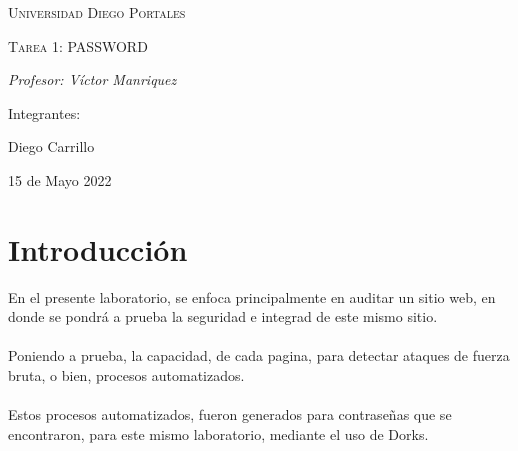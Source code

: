 \documentclass{article}
\begin{document}
    \begin{titlepage}
        \centering
        \vspace{1cm}
        {\scshape\Large Universidad Diego Portales \par}
        \vspace{2cm}
        {\scshape\Huge Tarea 1: PASSWORD\par}
        \vspace{1cm}
        \vspace{1cm}
        {\itshape\Large Profesor: Víctor Manriquez \par}
        \vfill
        {\Large Integrantes: \par}
        {\Large Diego Carrillo \par}
        \vfill
        {\Large 15 de Mayo 2022 \par}
    \end{titlepage}

\tableofcontents
 \newpage
 \section{Introducción}
 En el presente laboratorio, se enfoca principalmente en auditar un sitio web, en donde se pondrá a prueba la seguridad e integrad de este mismo sitio. 
 \\\\
 Poniendo a prueba, la capacidad, de cada pagina, para detectar ataques de fuerza bruta, o bien, procesos automatizados.
 \\\\
 Estos procesos automatizados, fueron generados para contraseñas que se encontraron, para este mismo laboratorio, mediante el uso de Dorks. 
\end{document}
